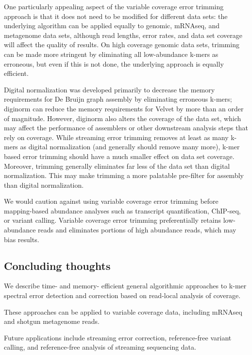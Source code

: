 \documentclass{article}
\begin{document}
One particularly appealing aspect of the variable coverage error
trimming approach is that it does not need to be modified for
different data sets: the underlying algorithm can be applied equally
to genomic, mRNAseq, and metagenome data sets, although read lengths,
error rates, and data set coverage will affect the quality of results.
On high coverage genomic data sets, trimming can be made more
stringent by eliminating all low-abundance k-mers as erroneous, but
even if this is not done, the underlying approach is equally
efficient.

Digital normalization was developed primarily to decrease the memory
requirements for De Bruijn graph assembly by eliminating erroneous
k-mers; diginorm can reduce the memory requirements for Velvet by more
than an order of magnitude.  However, diginorm also alters the
coverage of the data set, which may affect the performance of
assemblers or other downstream analysis steps that rely on coverage.
While streaming error trimming removes at least as many k-mers as
digital normalization (and generally should remove many more), k-mer
based error trimming should have a much smaller effect on data set
coverage.  Moreover, trimming generally eliminates far less of the
data set than digital normalization.  This may make trimming a more
palatable pre-filter for assembly than digital normalization.

We would caution against using variable coverage error trimming before
mapping-based abundance analyses such as transcript quantification,
ChIP-seq, or variant calling.  Variable coverage error trimming
preferentially retains low-abundance reads and eliminates portions of
high abundance reads, which may bias results.

\subsection{Concluding thoughts}

We describe time- and memory- efficient general algorithmic approaches
to k-mer spectral error detection and correction based on read-local
analysis of coverage.

These approaches can be applied to variable coverage data, including
mRNAseq and shotgun metagenome reads.

Future applications include streaming error correction, reference-free
variant calling, and reference-free analysis of streaming sequencing
data.


\end{document}
